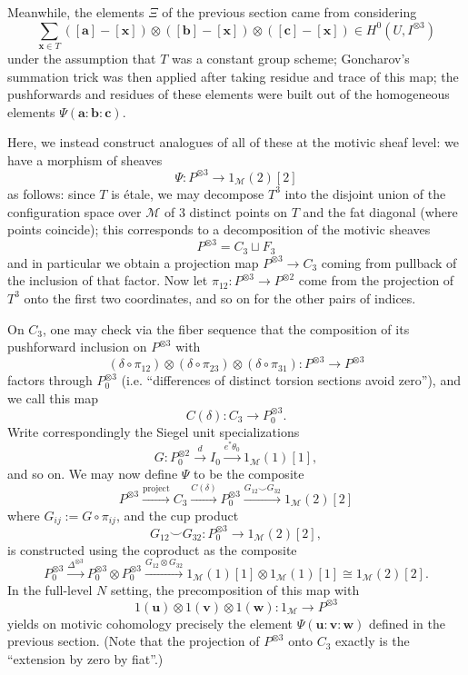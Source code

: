 \documentclass[a4paper,reqno,11pt]{amsart}
\theoremstyle{plain}
\theoremstyle{definition}
\theoremstyle{remark}
\begin{document}
Meanwhile, the elements $\Xi$ of the previous section came from considering
\[
\sum_{\mathbf{x}\in T} ([\mathbf{a}]-[\mathbf{x}]) \otimes ([\mathbf{b}]-[\mathbf{x}]) \otimes ([\mathbf{c}]-[\mathbf{x}]) \in H^0(U, I^{\otimes 3})
\]
under the assumption that $T$ was a constant group scheme; Goncharov's summation trick was then applied after taking residue and trace of this map; the pushforwards and residues of these elements were built out of the homogeneous elements $\Psi(\mathbf{a}:\mathbf{b}:\mathbf{c})$.

Here, we instead construct analogues of all of these at the motivic sheaf level: we have a morphism of sheaves
\[
    \Psi: P^{\otimes 3} \to 1_{\mathcal{M}}(2)[2]
\]
as follows: since $T$ is \'{e}tale, we may decompose $T^3$ into the disjoint union of the configuration space over $\mathcal{M}$ of $3$ distinct points on $T$ and the fat diagonal (where points coincide); this corresponds to a decomposition of the motivic sheaves
\[
P^{\otimes 3} = C_3 \sqcup F_3
\]
and in particular we obtain a projection map $P^{\otimes 3}\to C_3$ coming from pullback of the inclusion of that factor. Now let $\pi_{12}: P^{\otimes 3} \to P^{\otimes 2}$ come from the projection of $T^3$ onto the first two coordinates, and so on for the other pairs of indices. 

On $C_3$, one may check via the fiber sequence that the composition of its pushforward inclusion on $P^{\otimes 3}$ with
\[
(\delta\circ \pi_{12})\otimes (\delta\circ \pi_{23}) \otimes (\delta\circ \pi_{31}): P^{\otimes 3}\to P^{\otimes 3}
\]
factors through $P^{\otimes 3}_0$ (i.e. ``differences of distinct torsion sections avoid zero''), and we call this map
\[
   C(\delta):  C_3 \to P^{\otimes 3}_0.
\]
Write correspondingly the Siegel unit specializations
\[
G: P_0^{\otimes 2} \xrightarrow{d} I_0 \xrightarrow{e^*\theta_0} 1_{\mathcal{M}}(1)[1], 
\]
and so on. We may now define $\Psi$ to be the composite
\[
P^{\otimes 3} \xrightarrow{\mathrm{project}} C_3 \xrightarrow{C(\delta)} P^{\otimes 3}_0 \xrightarrow{G_{12} \smile G_{32}} 1_{\mathcal{M}}(2)[2] 
\]
where $G_{ij}:= G \circ \pi_{ij}$, and the cup product 
\[
G_{12} \smile G_{32}: P_0^{\otimes 3} \to 1_{\mathcal{M}}(2)[2],
\]
is constructed using the coproduct as the composite
\[
P_0^{\otimes 3} \xrightarrow{\Delta^{\otimes 3}} P_0^{\otimes 3} \otimes P_0^{\otimes 3} \xrightarrow{G_{12} \otimes G_{32}} 1_{\mathcal{M}}(1)[1] \otimes  1_{\mathcal{M}}(1)[1] \cong 1_{\mathcal{M}}(2)[2].
\]
In the full-level $N$ setting, the precomposition of this map with 
\[
1(\mathbf{u})\otimes 1(\mathbf{v}) \otimes 1(\mathbf{w}): 1_{\mathcal{M}} \to P^{\otimes 3}
\]
yields on motivic cohomology precisely the element $\Psi(\mathbf{u}:\mathbf{v}:\mathbf{w})$ defined in the previous section. (Note that the projection of $P^{\otimes 3}$ onto $C_3$ exactly is the ``extension by zero by fiat''.)
\end{document}
